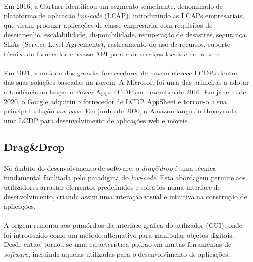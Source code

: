 \documentclass[pdflatex,sn-mathphys-num]{sn-jnl}
\theoremstyle{thmstyleone}
\theoremstyle{thmstyletwo}
\theoremstyle{thmstylethree}
\begin{document}
\paragraph{}Em 2016, a Gartner identificou um segmento semelhante, denominado de plataforma de aplicação \textit{low-code} (LCAP), introduzindo as LCAPs empresariais, que visam produzir aplicações de classe empresarial com requisitos de desempenho, escalabilidade, disponibilidade, recuperação de desastres, segurança, SLAs (Service Level Agreements), rastreamento do uso de recursos, suporte técnico do fornecedor e acesso API para e de serviços locais e em nuvem.\cite{bib2}

\paragraph{}Em 2021, a maioria dos grandes fornecedores de nuvem oferece LCDPs dentro das suas soluções baseadas na nuvem. A Microsoft foi uma das primeiras a adotar a tendência ao lançar o Power Apps LCDP em novembro de 2016. Em janeiro de 2020, o Google adquiriu o fornecedor de LCDP AppSheet e tornou-o a sua principal solução \textit{low-code}. Em junho de 2020, a Amazon lançou o Honeycode, uma LCDP para desenvolvimento de aplicações web e móveis.\cite{bib2}




\subsection{Drag\&Drop}\label{}


\paragraph{}No âmbito do desenvolvimento de software, o \textit{drag\&drop} é uma técnica fundamental facilitada pelo paradigma do \textit{low-code}. Esta abordagem permite aos utilizadores arrastar elementos predefinidos e soltá-los numa interface de desenvolvimento, criando assim uma interação visual e intuitiva na construção de aplicações.

\paragraph{}A origem remonta aos primórdios da interface gráfica do utilizador (GUI), onde foi introduzido como um método alternativo para manipular objetos digitais. Desde então, tornou-se uma característica padrão em muitas ferramentas de \textit{software}, incluindo aquelas utilizadas para o desenvolvimento de aplicações.
\end{document}
